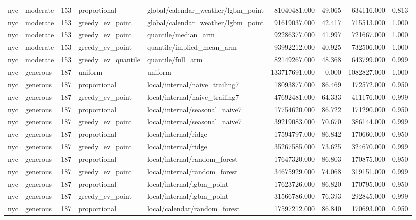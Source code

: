 \begin{tabular}{llrllrrrr}
nyc & moderate & 153 & proportional & global/calendar\_weather/lgbm\_point & 81040481.000 & 49.065 & 634116.000 & 0.813 \\
nyc & moderate & 153 & greedy\_ev\_point & global/calendar\_weather/lgbm\_point & 91619037.000 & 42.417 & 715513.000 & 1.000 \\
nyc & moderate & 153 & greedy\_ev\_point & quantile/median\_arm & 92286377.000 & 41.997 & 721667.000 & 1.000 \\
nyc & moderate & 153 & greedy\_ev\_point & quantile/implied\_mean\_arm & 93992212.000 & 40.925 & 732506.000 & 1.000 \\
nyc & moderate & 153 & greedy\_ev\_quantile & quantile/full\_arm & 82149267.000 & 48.368 & 643799.000 & 0.999 \\
nyc & generous & 187 & uniform & uniform & 133717691.000 & 0.000 & 1082827.000 & 1.000 \\
nyc & generous & 187 & proportional & local/internal/naive\_trailing7 & 18093877.000 & 86.469 & 172572.000 & 0.950 \\
nyc & generous & 187 & greedy\_ev\_point & local/internal/naive\_trailing7 & 47692481.000 & 64.333 & 411176.000 & 0.999 \\
nyc & generous & 187 & proportional & local/internal/seasonal\_naive7 & 17754620.000 & 86.722 & 171290.000 & 0.950 \\
nyc & generous & 187 & greedy\_ev\_point & local/internal/seasonal\_naive7 & 39219083.000 & 70.670 & 386144.000 & 0.999 \\
nyc & generous & 187 & proportional & local/internal/ridge & 17594797.000 & 86.842 & 170660.000 & 0.950 \\
nyc & generous & 187 & greedy\_ev\_point & local/internal/ridge & 35267585.000 & 73.625 & 324670.000 & 0.999 \\
nyc & generous & 187 & proportional & local/internal/random\_forest & 17647320.000 & 86.803 & 170875.000 & 0.950 \\
nyc & generous & 187 & greedy\_ev\_point & local/internal/random\_forest & 34675929.000 & 74.068 & 319151.000 & 0.999 \\
nyc & generous & 187 & proportional & local/internal/lgbm\_point & 17623726.000 & 86.820 & 170795.000 & 0.950 \\
nyc & generous & 187 & greedy\_ev\_point & local/internal/lgbm\_point & 31566786.000 & 76.393 & 292845.000 & 0.999 \\
nyc & generous & 187 & proportional & local/calendar/random\_forest & 17597212.000 & 86.840 & 170693.000 & 0.950 \\

\end{tabular}
